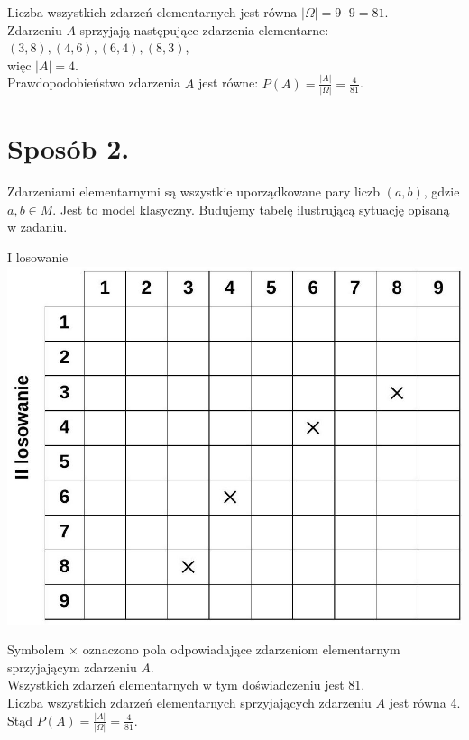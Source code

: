 \documentclass[10pt]{article}
\begin{document}
Liczba wszystkich zdarzeń elementarnych jest równa $|\Omega|=9 \cdot 9=81$.\\
Zdarzeniu $A$ sprzyjają następujące zdarzenia elementarne:\\
$(3,8),(4,6),(6,4),(8,3)$,\\
więc $|A|=4$.\\
Prawdopodobieństwo zdarzenia $A$ jest równe: $P(A)=\frac{|A|}{|\Omega|}=\frac{4}{81}$.

\section*{Sposób 2.}
Zdarzeniami elementarnymi są wszystkie uporządkowane pary liczb $(a, b)$, gdzie $a, b \in M$. Jest to model klasyczny. Budujemy tabelę ilustrującą sytuację opisaną w zadaniu.

I losowanie\\
\includegraphics[max width=\textwidth, center]{2025_02_07_191ba7668814b12476d0g-24}

Symbolem $\times$ oznaczono pola odpowiadające zdarzeniom elementarnym sprzyjającym zdarzeniu $A$.\\
Wszystkich zdarzeń elementarnych w tym doświadczeniu jest 81.\\
Liczba wszystkich zdarzeń elementarnych sprzyjających zdarzeniu $A$ jest równa 4.\\
Stąd $P(A)=\frac{|A|}{|\Omega|}=\frac{4}{81}$.
\end{document}
